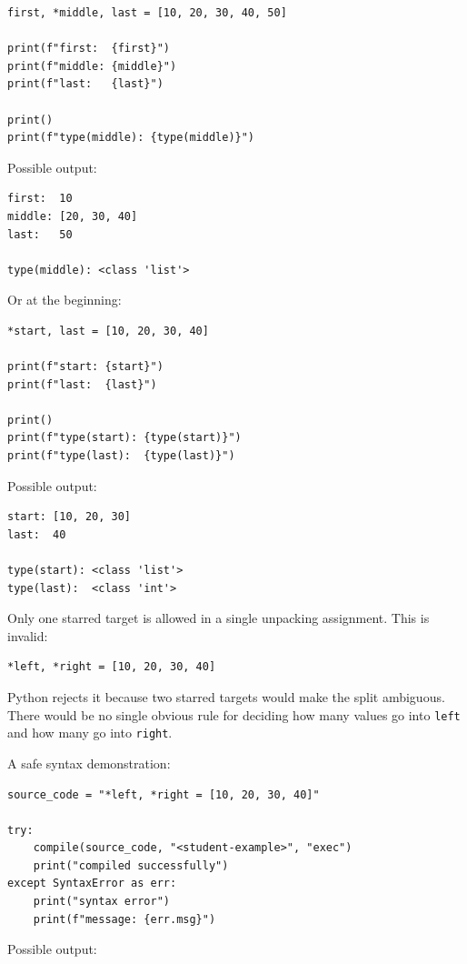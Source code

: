 \begin{verbatim}
first, *middle, last = [10, 20, 30, 40, 50]

print(f"first:  {first}")
print(f"middle: {middle}")
print(f"last:   {last}")

print()
print(f"type(middle): {type(middle)}")
\end{verbatim}

Possible output:

\begin{verbatim}
first:  10
middle: [20, 30, 40]
last:   50

type(middle): <class 'list'>
\end{verbatim}

Or at the beginning:

\begin{verbatim}
*start, last = [10, 20, 30, 40]

print(f"start: {start}")
print(f"last:  {last}")

print()
print(f"type(start): {type(start)}")
print(f"type(last):  {type(last)}")
\end{verbatim}

Possible output:

\begin{verbatim}
start: [10, 20, 30]
last:  40

type(start): <class 'list'>
type(last):  <class 'int'>
\end{verbatim}

Only one starred target is allowed in a single unpacking assignment. This is invalid:

\begin{verbatim}
*left, *right = [10, 20, 30, 40]
\end{verbatim}

Python rejects it because two starred targets would make the split ambiguous. There would be no single obvious rule for deciding how many values go into \texttt{left} and how many go into \texttt{right}.

A safe syntax demonstration:

\begin{verbatim}
source_code = "*left, *right = [10, 20, 30, 40]"

try:
    compile(source_code, "<student-example>", "exec")
    print("compiled successfully")
except SyntaxError as err:
    print("syntax error")
    print(f"message: {err.msg}")
\end{verbatim}

Possible output:

